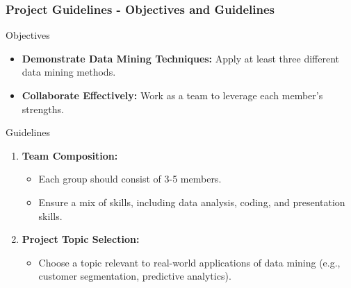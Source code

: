 \documentclass[aspectratio=169]{beamer}
\begin{document}
\begin{frame}[fragile]
    \frametitle{Project Guidelines - Objectives and Guidelines}
    \begin{block}{Objectives}
        \begin{itemize}
            \item \textbf{Demonstrate Data Mining Techniques:} Apply at least three different data mining methods.
            \item \textbf{Collaborate Effectively:} Work as a team to leverage each member's strengths.
        \end{itemize}
    \end{block}
    
    \begin{block}{Guidelines}
        \begin{enumerate}
            \item \textbf{Team Composition:}
                \begin{itemize}
                    \item Each group should consist of 3-5 members.
                    \item Ensure a mix of skills, including data analysis, coding, and presentation skills.
                \end{itemize}
                
            \item \textbf{Project Topic Selection:}
                \begin{itemize}
                    \item Choose a topic relevant to real-world applications of data mining (e.g., customer segmentation, predictive analytics).
                \end{itemize}
        \end{enumerate}
    \end{block}
\end{frame}
\end{document}
